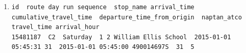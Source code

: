 \begin{enumerate}
\item \begin{verbatim}
id  route day run sequence  stop_name arrival_time  cumulative_travel_time  departure_time_from_origin  naptan_atco travel_time arrival_hour
15481187  C2  Saturday  1 2 William Ellis School  2015-01-01 05:45:31 31  2015-01-01 05:45:00 490014697S  31  5
      \end{verbatim}

\end{enumerate}



